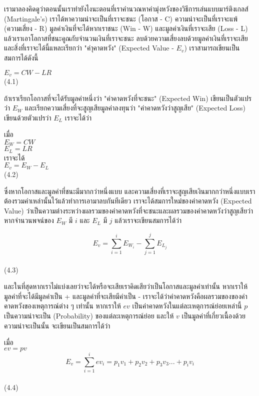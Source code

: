 \documentclass[12pt]{article}
\begin{document}
เรามาลองคิดดูว่าตอนนั้นเราทำยังไงนะตอนที่เราคำนวณหาค่ามุ่งหวังของวิธีการเล่นแบบมาร์ติงเกลส์ (Martingale's) เราได้หาความน่าจะเป็นที่เราจะชนะ (โอกาส - C) ความน่าจะเป็นที่เราจะแพ้ (ความเสี่ยง - R) มูลค่าเงินที่จะได้หากเราชนะ (Win - W) และมูลค่าเงินที่เราจะเสีย (Loss - L) แล้วเราเอาโอกาสที่ชนะคูณกับจำนวนเงินที่เราจะชนะ ลบด้วยความเสี่ยงลบด้วยมูลค่าเงินที่เราจะเสีย และสิ่งที่เราจะได้นี้แหละเรียกว่า "ค่าุคาดหวัง" (Expected Value - $E_v$) เราสามารถเขียนเป็นสมการได้ดังนี้

\begin{center}
$E_v = CW - LR$\\
(4.1)
\end{center} 

ถ้าเราเรียกโอกาสที่จะได้รับมูลค่าหนึ่งว่า "ค่าคาดหวังที่จะชนะ" (Expected Win)  เขียนเป็นตัวแปรว่า $E_W$ และเรียกความเสี่ยงที่จะสูญเสียมูลค่าลงทุนว่า "ค่าคาดหวังว่าสูญเสีย" (Expected Loss) เขียนด้วยตัวแปรว่า $E_L$ เราจะได้ว่า

 \begin{center}
 เมื่อ\\
$E_W=CW$\\
$E_L=LR$\\
เราจะได้\\
$E_v = E_W - E_L$\\
(4.2)
\end{center} 

ซึ่งหากโอกาสและมูลค่าที่ชนะมีมากกว่าหนึ่งแบบ และความเสี่ยงที่เราจะสูญเสียเงินมากกว่าหนึ่งแบบเราต้องรวมค่าเหล่านั้นไว้แล้วทำการเอามาลบกันทีเดียว เราจะได้สมการใหม่ของค่าคาดหวัง (Expected Value) ว่าเป็นความต่างระหว่างผลรวมของค่าคาดหวังที่จะชนะและผลรวมของค่าคาดหวังว่าสูญเสียว่า หากจำนวนพจน์ของ $E_W$ มี $i$ และ $E_L$ มี $j$ แล้วเราจะเขียนสมการได้ว่า

\begin{center}
$$E_v=\sum_{i=1}^{i}E_{W_i}-\sum_{j=1}^{j}E_{L_j}$$\\(4.3)\\
\end{center}

และในที่สุดหากเราไม่แบ่งเลยว่าจะได้หรือจะเสียเราคิดเสียว่าเป็นโอกาสและมูลค่าเท่านั้น หากเราให้มูลค่าที่จะได้มีมูลค่าเป็น + และมูลค่าที่จะเสียมีค่าเป็น - เราจะได้ว่าค่าคาดหวังคือผลรวมของของค่าคาดหวังของเหตุการณ์ต่าง ๆ เท่านั้น หากเราให้ $ev$ เป็นค่าคาดหวังในแต่ละเหตุการณ์ย่อยเหล่านี้ $p$ เป็นความน่าจะเป็น (Probability) ของแต่ละเหตุการณ์ย่อย และให้ $v$ เป็นมูลค่าที่เกี่ยวเนื้องด้วยความน่าจะเป็นนั้น จะเขียนเป็นสมการได้ว่า

\begin{center}
เมื่อ\\
$ev=pv$\\
$$E_v=\sum_{i=1}^{i}ev_i=p_1v_1+p_2v_2+p_3v_3...+p_iv_i$$\\(4.4)\\
\end{center}
\end{document}
